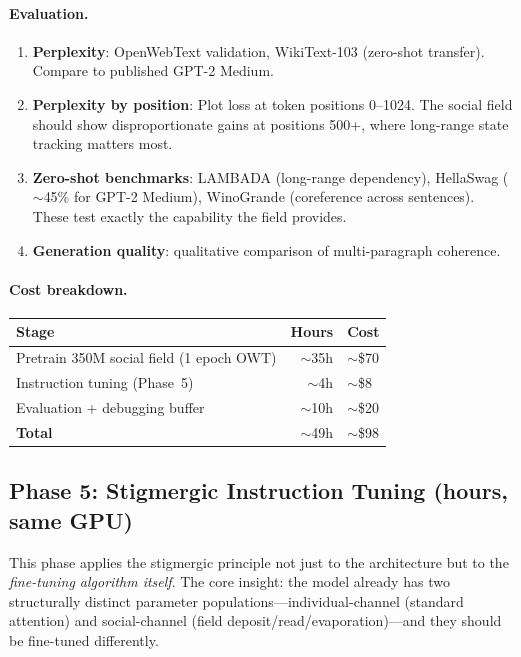 \documentclass[11pt,a4paper]{article}
\begin{document}
\paragraph{Evaluation.}
\begin{enumerate}
    \item \textbf{Perplexity}: OpenWebText validation, WikiText-103
          (zero-shot transfer).  Compare to published GPT-2 Medium.
    \item \textbf{Perplexity by position}: Plot loss at token
          positions 0--1024.  The social field should show
          disproportionate gains at positions 500+, where long-range
          state tracking matters most.
    \item \textbf{Zero-shot benchmarks}: LAMBADA (long-range
          dependency), HellaSwag ($\sim$45\% for GPT-2 Medium),
          WinoGrande (coreference across sentences).  These test
          exactly the capability the field provides.
    \item \textbf{Generation quality}: qualitative comparison of
          multi-paragraph coherence.
\end{enumerate}

\paragraph{Cost breakdown.}
\begin{center}
\begin{tabular}{lrl}
\toprule
\textbf{Stage} & \textbf{Hours} & \textbf{Cost} \\
\midrule
Pretrain 350M social field (1 epoch OWT) & $\sim$35h & $\sim$\$70 \\
Instruction tuning (Phase~5) & $\sim$4h & $\sim$\$8 \\
Evaluation + debugging buffer & $\sim$10h & $\sim$\$20 \\
\midrule
\textbf{Total} & $\sim$49h & $\sim$\$98 \\
\bottomrule
\end{tabular}
\end{center}


\subsection{Phase 5: Stigmergic Instruction Tuning (hours, same GPU)}

This phase applies the stigmergic principle not just to the
architecture but to the \emph{fine-tuning algorithm itself}.  The core
insight: the model already has two structurally distinct parameter
populations---individual-channel (standard attention) and
social-channel (field deposit/read/evaporation)---and they should be
fine-tuned differently.
\end{document}
